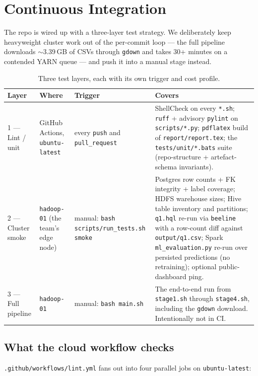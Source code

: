 \documentclass[11pt,a4paper]{article}
\begin{document}
\section{Continuous Integration}

The repo is wired up with a three-layer test strategy. We deliberately
keep heavyweight cluster work out of the per-commit loop --- the full
pipeline downloads $\sim$3.39\,GB of CSVs through \texttt{gdown} and
takes 30+ minutes on a contended YARN queue --- and push it into a
manual stage instead.

\begin{table}[H]
\centering
\small
\begin{tabular}{p{2.8cm}p{4.0cm}p{2.4cm}p{5.0cm}}
\toprule
\textbf{Layer} & \textbf{Where} & \textbf{Trigger} & \textbf{Covers} \\
\midrule
1 --- Lint / unit & GitHub Actions, \texttt{ubuntu-latest} & every
\texttt{push} and \texttt{pull\_request} & ShellCheck on every
\texttt{*.sh}; \texttt{ruff} + advisory \texttt{pylint} on
\texttt{scripts/*.py}; \texttt{pdflatex} build of
\texttt{report/report.tex}; the \texttt{tests/unit/*.bats} suite
(repo-structure + artefact-schema invariants). \\
\midrule
2 --- Cluster smoke & \texttt{hadoop-01} (the team's edge node) &
manual: \texttt{bash scripts/run\_tests.sh smoke} & Postgres row counts
+ FK integrity + label coverage; HDFS warehouse sizes; Hive table
inventory and partitions; \texttt{q1.hql} re-run via \texttt{beeline}
with a row-count diff against \texttt{output/q1.csv}; Spark
\texttt{ml\_evaluation.py} re-run over persisted predictions
(no retraining); optional public-dashboard ping. \\
\midrule
3 --- Full pipeline & \texttt{hadoop-01} & manual:
\texttt{bash main.sh} & The end-to-end run from
\texttt{stage1.sh} through \texttt{stage4.sh}, including the
\texttt{gdown} download. Intentionally not in CI. \\
\bottomrule
\end{tabular}
\caption{Three test layers, each with its own trigger and cost profile.}
\end{table}

\subsection{What the cloud workflow checks}

\texttt{.github/workflows/lint.yml} fans out into four parallel jobs on
\texttt{ubuntu-latest}:
\end{document}
